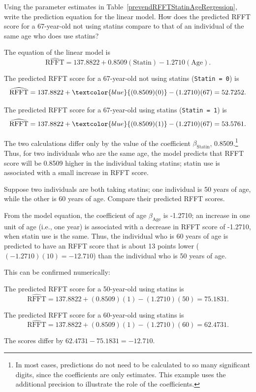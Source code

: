 \begin{example}{Using the parameter estimates in Table~\ref{prevendRFFTStatinAgeRegression}, write the prediction equation for the linear model. How does the predicted RFFT score for a 67-year-old not using statins compare to that of an individual of the same age who does use statins?}
	
The equation of the linear model is
\[\widehat{\text{RFFT}} = 137.8822 + 0.8509(\text{Statin}) - 1.2710(\text{Age}). \]	

The predicted RFFT score for a 67-year-old not using statins (\texttt{Statin = 0}) is
\[\widehat{\text{RFFT}} = 137.8822 + \textcolor{blue}{(0.8509)(0)} - (1.2710)(67) = 52.7252. \]

The predicted RFFT score for a 67-year-old using statins (\texttt{Statin = 1}) is
\[\widehat{\text{RFFT}} = 137.8822 + \textcolor{blue}{(0.8509)(1)} - (1.2710)(67) = 53.5761. \]


The two calculations differ only by the value of the coefficient $\beta_{\text{Statin}}$, 0.8509.\footnote{In most cases, predictions do not need to be calculated to so many significant digits, since the coefficients are only estimates. This example uses the additional precision to illustrate the role of the coefficients.} Thus, for two individuals who are the same age, the model predicts that RFFT score will be 0.8509 higher in the individual taking statins; statin use is associated with a small increase in RFFT score.
	
\end{example}

\begin{example}{Suppose two individuals are both taking statins; one individual is 50 years of age, while the other is 60 years of age. Compare their predicted RFFT scores.} 

From the model equation, the coefficient of age $\beta_{\text{Age}}$ is -1.2710; an increase in one unit of age (i.e., one year) is associated with a decrease in RFFT score of -1.2710, when statin use is the same. Thus, the individual who is 60 years of age is predicted to have an RFFT score that is about 13 points lower ($(-1.2710)(10) = -12.710$) than the individual who is 50 years of age. 

This can be confirmed numerically:

The predicted RFFT score for a 50-year-old using statins is
\[\widehat{\text{RFFT}} = 137.8822 + (0.8509)(1) - (1.2710)(50) = 75.1831. \]

The predicted RFFT score for a 60-year-old using statins is
\[\widehat{\text{RFFT}} = 137.8822 + (0.8509)(1) - (1.2710)(60) = 62.4731. \]

The scores differ by $62.4731 - 75.1831 = - 12.710.$
	
\end{example}

